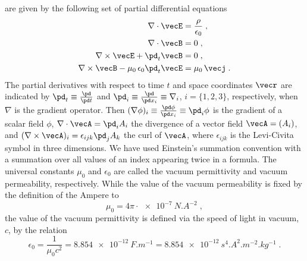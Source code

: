\documentclass[
twoside,
openright,
titlepage,
numbers=noenddot,
headinclude,
fleqn,
a4paper,
footinclude=true,
cleardoublepage=empty,
abstractoff,
BCOR=5mm,
paper=a4,
fontsize=11pt,
british,ngerman,american,
]{scrreprt}
\begin{document}
are given by the following set of partial differential equations
\begin{equation}
  \label{eq:maxwell-equations-micro}
  \begin{split}
    \nabla\cdot\vecE &= \frac{\rho}{\epsilon_0} \;,\\
    \nabla\cdot\vecB &= 0\;,\\
    \nabla \times \vecE +\pd_t\vecB &= 0\;,\\
    \nabla \times \vecB -\mu_0\,\epsilon_0\pd_t\vecE &= \mu_0\,\vecj\;.
  \end{split}
\end{equation}
The partial derivatives with respect to time $t$ and space coordinates
$\vecr$ are indicated by $\pd_t\equiv\frac{\pd}{\pd t}$ and
$\pd_i\equiv\frac{\pd}{\pd x_i}\equiv\nabla_i$, $i=\{1,2,3\}$,
respectively, when $\nabla$ is the gradient operator.  Then
$(\nabla\phi)_i\equiv\frac{\pd\phi}{\pd x_i}\equiv\pd_i\phi$ is the
gradient of a scalar field $\phi$, $\nabla\cdot\vecA=\pd_i A_i$ the
divergence of a vector field $\vecA=(A_i)$, and
$(\nabla\times\vecA)_i=\epsilon_{i j k}\pd_j A_k$ the curl of $\vecA$,
where $\epsilon_{i j k}$ is the Levi-Civita symbol in three
dimensions.  We have used Einstein's summation convention with a
summation over all values of an index appearing twice in a formula.
The universal constants $\mu_0$ and $\epsilon_0$ are called the vacuum
permittivity and vacuum permeability, respectively.  While the value
of the vacuum permeability is fixed by the definition of the Ampere
\footnotemark[\value{footnote}] to
\begin{equation}
  \label{eq:vacuum-permeablity}
  \mu_0 = 4\pi\cdot\SI{e-7}{N.A^{-2}} \;,
\end{equation}
the value of the vacuum permittivity is defined via the speed of light
in vacuum, $c$, by the relation
\begin{equation}
  \label{eq:vacuum-permittivity}
  \epsilon_0 = \frac{1}{\mu_0 c^2} 
  = \SI{8.854e-12}{F.m^{-1}}
  = \SI{8.854e-12}{s^4.A^2.m^{-2}.kg^{-1}} \;.
\end{equation}
\end{document}
